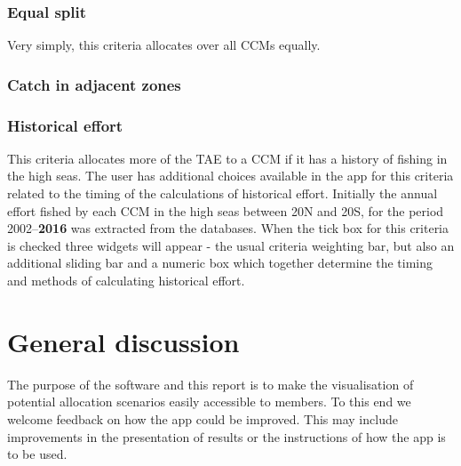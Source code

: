 \documentclass[11pt]{article}
\begin{document}
\subsubsection*{Equal split}
Very simply, this criteria allocates over all CCMs equally.

\subsubsection*{Catch in adjacent zones} 


\subsubsection*{Historical effort}
This criteria allocates more of the TAE to a CCM if it has a history of fishing in the high seas. The user has additional choices available in the app for this criteria related to the timing of the calculations of historical effort. Initially the annual effort fished by each CCM in the high seas between 20\degree N and 20\degree S, for the period 2002--{\bf 2016} was extracted from the databases. When the tick box for this criteria is checked three widgets will appear - the usual criteria weighting bar, but also an additional sliding bar and a numeric box which together determine the timing and methods of calculating historical effort.



\section{General discussion}

The purpose of the software and this report is to make the visualisation of potential allocation scenarios easily accessible to members. To this end we welcome feedback on how the app could be improved. This may include improvements in the presentation of results or the instructions of how the app is to be used.



\newpage

%
\end{document}
